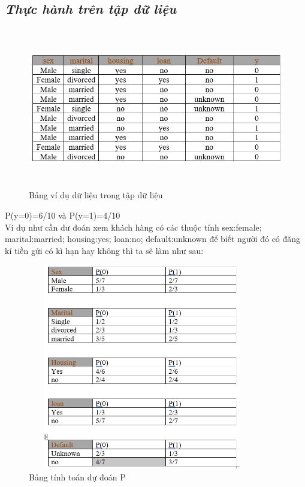 \documentclass{report}
\begin{document}
\subsection{\textit{Thực hành trên tập dữ liệu}}
    \fontsize{13}{14}\selectfont
  \begin{center}
        \begin{figure}[htp]
    	\begin{center}
    		\includegraphics[width=15cm, height=7cm]{images/Nb_ex.PNG}
    	\end{center}
    		\caption{Bảng ví dụ dữ liệu trong tập dữ liệu}
    \end{figure}
    \end{center}
   P(y=0)=6/10 và P(y=1)=4/10\\
       \indent Ví dụ như cần dư đoán xem khách hàng có các thuộc tính {sex:female; marital:married; housing:yes; loan:no; default:unknown} để biết người đó có đăng kí tiền gửi có kì hạn hay không thì ta sẽ làm như sau:
  \pagebreak
   \begin{center}
        \begin{figure}[htp]
    	\begin{center}
    		\includegraphics[width=10cm, height=9cm]{images/vd_nb.PNG}
    	\end{center}
    		\caption{Bảng tính toán dự đoán P}
    \end{figure}
    \end{center}
\end{document}
